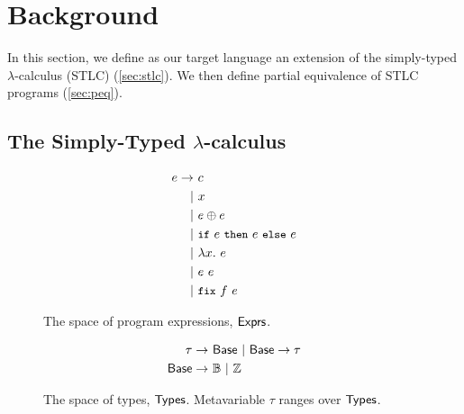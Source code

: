 \section{Background}
\label{sec:background}
%
In this section, we define as our target language an extension of the
simply-typed $\lambda$-calculus (STLC) (\autoref{sec:stlc}).
%
We then define partial equivalence of STLC programs
(\autoref{sec:peq}).

\subsection{The Simply-Typed $\lambda$-calculus}
\label{sec:stlc}
\begin{figure}[t]
  \begin{minipage}{0.48\linewidth}
    \begin{align*}
      e \rightarrow &\ c \\
      | &\ x \\
      | &\ e \oplus e \\
      | &\ \ite{ e }{ e }{ e } \\
      | &\ \lambda x.\ e \\
      | &\ e\ e \\
      | &\ \fix{ f }{ e }
    \end{align*}
    \caption{The space of program expressions, $\mathsf{Exprs}$.} %
    \label{fig:exprs}
  \end{minipage}
  \begin{minipage}{0.48\linewidth}
    \begin{align*} %
      \tau \rightarrow &\ \base\ %
      |\ \base \to \tau \\
      \base \rightarrow &\ \bools\ %
      |\ \ints
    \end{align*}
    \caption{The space of types, $\mathsf{Types}$.
      Metavariable $\tau$ ranges over $\mathsf{Types}$.} %
    \label{fig:types}
  \end{minipage}
\end{figure}


